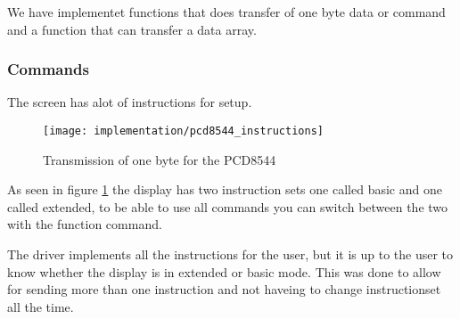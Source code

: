 We have implementet functions that does transfer of one byte data or command and a function that can transfer a data array.


\subsubsection{Commands}
The screen has alot of instructions for setup.

\begin{figure}
	\centering
	\texttt{[image: implementation/pcd8544\_instructions]}
	\caption{Transmission of one byte for the PCD8544\cite[p. 12]{philips:pcd8544}}
	\label{fig:pcd8544_Instructions}
\end{figure}

As seen in figure \ref{fig:pcd8544_Instructions} the display has two instruction sets
one called basic and one called extended, to be able to use all commands you can switch between the two with the function command.

The driver implements all the instructions for the user, but it is up to the user to know whether the display is in extended or basic mode.
This was done to allow for sending more than one instruction and not haveing to change instructionset all the time.
